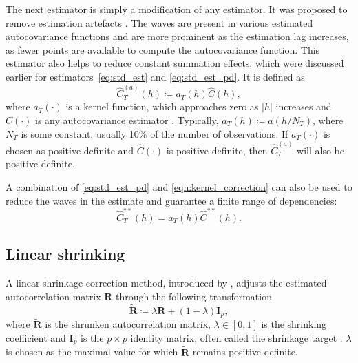 The next estimator is simply a modification of any estimator. It was
proposed to remove estimation  artefacts
\citep[Section~3.17]{Yaglom1987}. The waves are present in various
estimated autocovariance functions and are more prominent as the
estimation lag increases, as fewer points are available to compute the
autocovariance function. This estimator also helps to reduce constant
summation effects, which were discussed earlier for
estimators~\eqref{eq:std_est} and \eqref{eq:std_est_pd}. It is defined
as \begin{equation}
 \label{eqn:kernel_correction}
    \widehat{C}_{T}^{(a)}(h) \coloneq a_{T}(h) \widehat{C}(h) ,
\end{equation} where \(a_{T}(\cdot)\) is a kernel function, which
approaches zero as \(\left| h \right|\) increases and
\(\widehat{C}(\cdot)\) is any autocovariance estimator
\citep[Section~3.17]{Yaglom1987}. Typically,
\(a_{T}(h) \coloneq a(h / N_{T})\), where \(N_{T}\) is some constant,
usually 10\% of the number of observations. If \(a_{T}(\cdot)\) is
chosen as positive-definite and \(\widehat{C}(\cdot)\) is
positive-definite, then \(\widehat{C}_{T}^{(a)}\) will also be
positive-definite.

A combination of \eqref{eq:std_est_pd} and \eqref{eqn:kernel_correction}
can also be used to reduce the waves in the estimate and guarantee a
finite range of dependencies: \begin{equation}
 \label{eqn:kernel_correction_std_pd}
    \widehat{C}_{T}^{**}(h) = a_{T}(h) \widehat{C}^{**}(h) .
\end{equation}

\subsection{Linear shrinking}\label{linear-shrinking}

A linear shrinkage correction method, introduced by \citet{Devlin1975},
adjusts the estimated autocorrelation matrix \(\bm{R}\) through the
following transformation \begin{equation}
 \label{eqn:linear_shrinking}
    \widetilde{\bm{R}} \coloneq \lambda \bm{R} + (1 - \lambda)\bm{I}_{p} ,
\end{equation} where \(\widetilde{\bm{R}}\) is the shrunken
autocorrelation matrix, \(\lambda \in [0, 1]\) is the shrinking
coefficient and \(\bm{I}_{p}\) is the \(p \times p\) identity matrix,
often called the shrinkage target \citep{Rousseeuw1993}. \(\lambda\) is
chosen as the maximal value for which \(\widetilde{\bm{R}}\) remains
positive-definite.

